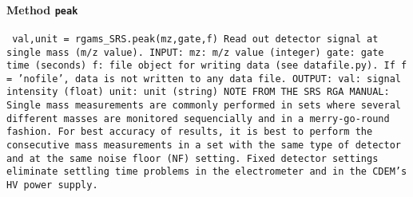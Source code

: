 \paragraph{Method \texttt{peak}}
\vspace{1ex}
\texttt{\newline
val,unit = rgams_SRS.peak(mz,gate,f)\newline
\newline
Read out detector signal at single mass (m/z value).\newline
\newline
INPUT:\newline
mz: m/z value (integer)\newline
gate: gate time (seconds)\newline
f: file object for writing data (see datafile.py). If f = 'nofile', data is not written to any data file.\newline
\newline
OUTPUT:\newline
val: signal intensity (float)\newline
unit: unit (string)\newline
\newline
NOTE FROM THE SRS RGA MANUAL:\newline
Single mass measurements are commonly performed in sets\newline
where several different masses are monitored sequencially\newline
and in a merry-go-round fashion.\newline
For best accuracy of results, it is best to perform the consecutive\newline
mass measurements in a set with the same type of detector\newline
and at the same noise floor (NF) setting.\newline
Fixed detector settings eliminate settling time problems\newline
in the electrometer and in the CDEM's HV power supply.\newline
\newline
}

